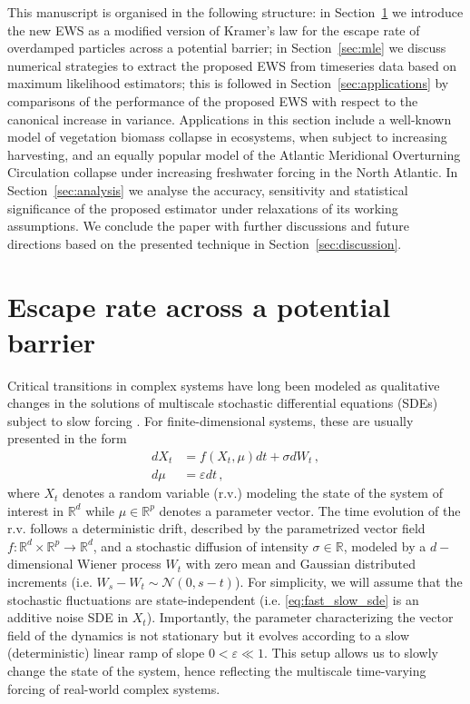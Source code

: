 \documentclass[a4paper,fleqn]{cas-sc}
\newcommand{\sref}[1]{Section~\ref{#1}}
\begin{document}
This manuscript is organised in the following structure: in \sref{sec:escape_rate} we introduce the new EWS as a modified version of Kramer's law for the escape rate of overdamped particles across a potential barrier; 
in \sref{sec:mle} we discuss numerical strategies to extract the proposed EWS from timeseries data based on maximum likelihood estimators; 
this is followed in \sref{sec:applications} by comparisons of the performance of the proposed EWS with respect to the canonical increase in variance.
Applications in this section include a well-known model of vegetation biomass collapse in ecosystems, when subject to increasing harvesting, and an equally popular model of the Atlantic Meridional Overturning Circulation collapse under increasing freshwater forcing in the North Atlantic. 
In \sref{sec:analysis} we analyse the accuracy, sensitivity and statistical significance of the proposed estimator under relaxations of its working assumptions.
We conclude the paper with further discussions and future directions based on the presented technique in \sref{sec:discussion}.
%
\section{Escape rate across a potential barrier}\label{sec:escape_rate}
Critical transitions in complex systems have long been modeled as qualitative changes in the solutions of multiscale stochastic differential equations (SDEs) subject to slow forcing \cite{Kuehn2011}.
For finite-dimensional systems, these are usually presented in the form
%
\begin{equation}
        \begin{aligned}\label{eq:fast_slow_sde}
                dX_{t} &= f(X_{t},\mu)dt + \sigma dW_{t}\,,\\
                d\mu &= \varepsilon dt\,,
        \end{aligned}
\end{equation}
%
where $X_t$ denotes a random variable (r.v.) modeling the state of the system of interest in $\mathbb{R}^{d}$ while $\mu\in \mathbb{R}^{p}$ denotes a parameter vector.
The time evolution of the r.v. follows a deterministic drift, described by the parametrized vector field $f:\mathbb{R}^{d}\times \mathbb{R}^{p}\to \mathbb{R}^{d}$, and a stochastic diffusion of intensity $\sigma\in\mathbb{R}$, modeled by a $d-$dimensional Wiener process $W_{t}$ with zero mean and Gaussian distributed increments (i.e. $W_{s} - W_{t}\sim\mathcal{N}(0,s-t)$).
For simplicity, we will assume that the stochastic fluctuations are state-independent (i.e. \eqref{eq:fast_slow_sde} is an additive noise SDE in $X_t$).
Importantly, the parameter characterizing the vector field of the dynamics is not stationary but it evolves according to a slow (deterministic) linear ramp of slope $0 < \varepsilon \ll 1$.
This setup allows us to slowly change the state of the system, hence reflecting the multiscale time-varying forcing of real-world complex systems.
\end{document}
